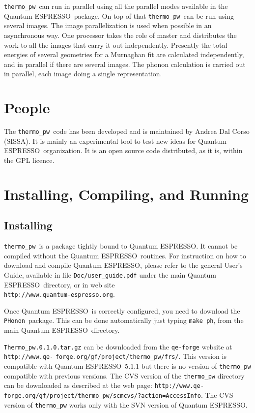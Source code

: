 \documentclass[12pt,a4paper]{article}
\def\qe{{\sc Quantum ESPRESSO}}
\def\PHonon{\texttt{PHonon}}
\def\thermo{\texttt{thermo\_pw}}
\begin{document}
\thermo\ can run in parallel using all the parallel modes available in
the \qe\ package. On top of that \thermo\ can be run using several images.
The image parallelization is used when possible in an asynchronous way.
One processor takes the role of master and distributes the work 
to all the images that carry it out independently. Presently 
the total energies of several geometries for a Murnaghan fit are
calculated independently, and in parallel if there are several images.  
The phonon calculation is carried out in parallel, each image doing 
a single representation.

\section{People}
The \thermo\ code has been developed and is maintained by Andrea Dal Corso 
(SISSA). It is mainly an experimental tool to test new ideas for \qe\ 
organization. It is an open source code distributed, as it is, within the GPL 
licence.  

\section{Installing, Compiling, and Running}

\subsection{Installing}

\thermo\ is a package tightly bound to \qe. It cannot be compiled without
the \qe\ routines. For instruction on how to download and compile \qe, please 
refer to the general User's Guide, available in file \texttt{Doc/user\_guide.pdf}
under the main \qe\ directory, or in web site \\
\texttt{http://www.quantum-espresso.org}.

Once \qe\ is correctly configured, you need to download the \PHonon\ 
package. This can be done automatically just typing \texttt{make ph}, from 
the main \qe\ directory.

\texttt{Thermo\_pw.0.1.0.tar.gz} can be downloaded from the 
\texttt{qe-forge} website at \texttt{http://www.qe-} \texttt{forge.org/gf/project/thermo\_pw/frs/}. This version is compatible with \qe\ 5.1.1
but there is no version of \texttt{thermo\_pw} compatible with previous
versions.
The CVS version of the \texttt{thermo\_pw} directory can be downloaded as 
described at
the web page: \texttt{http://www.qe-} \texttt{forge.org/gf/project/thermo\_pw/scmcvs/?action=AccessInfo}.
The CVS version of \texttt{thermo\_pw} works only with the SVN version of \qe. 
\end{document}

